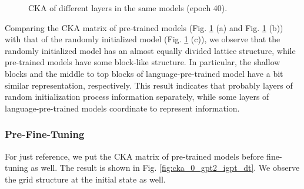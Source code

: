 \documentclass{article}
\begin{document}
\begin{figure}[H]
\begin{minipage}[b]{0.32\linewidth}
    \end{minipage}
    \caption{CKA of different layers in the same models (epoch 40).}
    \label{fig:cka_40_gpt2_igpt_dt}
\end{figure}

Comparing the CKA matrix of pre-trained models (Fig. \ref{fig:cka_40_gpt2_igpt_dt} (a) and Fig. \ref{fig:cka_40_gpt2_igpt_dt} (b)) with that of the randomly initialized model (Fig. \ref{fig:cka_40_gpt2_igpt_dt} (c)), we observe that the randomly initialized model has an almost equally divided lattice structure, while pre-trained models have some block-like structure. In particular, the shallow blocks and the middle to top blocks of language-pre-trained model have a bit similar representation, respectively. 
This result indicates that probably layers of random initialization process information separately, while some layers of language-pre-trained models coordinate to represent information.

\subsubsection{Pre-Fine-Tuning}
For just reference, we put the CKA matrix of pre-trained models before fine-tuning as well. The result is shown in Fig. \ref{fig:cka_0_gpt2_igpt_dt}. We observe the grid structure at the initial state as well.
\end{document}
